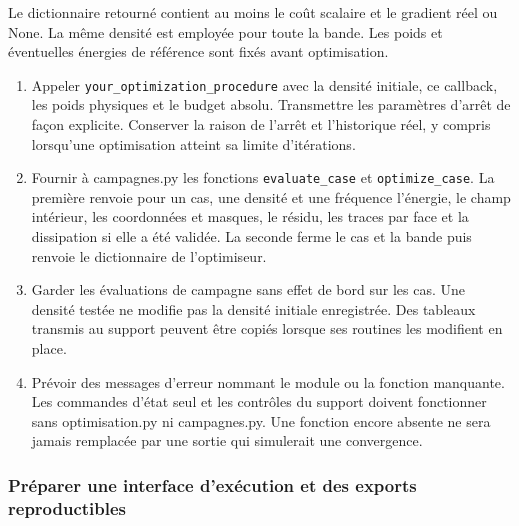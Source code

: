 \documentclass[11pt,a4paper]{article}
\begin{document}
   Le dictionnaire retourné contient au moins le coût scalaire et le gradient réel ou {\small\ttfamily None}. La même densité est employée pour toute la bande. Les poids et éventuelles énergies de référence sont fixés avant optimisation.
\begin{enumerate}
\item Appeler {\small\ttfamily \nolinkurl{your_optimization_procedure}} avec la densité initiale, ce callback, les poids physiques et le budget absolu. Transmettre les paramètres d'arrêt de façon explicite. Conserver la raison de l'arrêt et l'historique réel, y compris lorsqu'une optimisation atteint sa limite d'itérations.
\item Fournir à {\small\ttfamily campagnes.py} les fonctions {\small\ttfamily \nolinkurl{evaluate_case}} et {\small\ttfamily \nolinkurl{optimize_case}}. La première renvoie pour un cas, une densité et une fréquence l'énergie, le champ intérieur, les coordonnées et masques, le résidu, les traces par face et la dissipation si elle a été validée. La seconde ferme le cas et la bande puis renvoie le dictionnaire de l'optimiseur.
\item Garder les évaluations de campagne sans effet de bord sur les cas. Une densité testée ne modifie pas la densité initiale enregistrée. Des tableaux transmis au support peuvent être copiés lorsque ses routines les modifient en place.
\item Prévoir des messages d'erreur nommant le module ou la fonction manquante. Les commandes d'état seul et les contrôles du support doivent fonctionner sans {\small\ttfamily optimisation.py} ni {\small\ttfamily campagnes.py}. Une fonction encore absente ne sera jamais remplacée par une sortie qui simulerait une convergence.
\end{enumerate}

\subsubsection{Préparer une interface d'exécution et des exports reproductibles}
\end{document}
